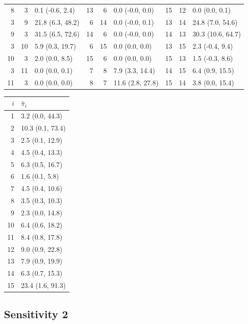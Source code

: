 \begin{table}
\begin{tabular}{|rrl||rrl||rrl|}
 8 & 3 & 0.1 (-0.6, 2.4) & 13 & 6 & 0.0 (-0.0, 0.0) & 15 & 12 & 0.0 (0.0, 0.1) \\
 3 & 9 & 21.8 (6.3, 48.2) & 6 & 14 & 0.0 (-0.0, 0.1) & 13 & 14 & 24.8 (7.0, 54.6) \\
 9 & 3 & 31.5 (6.5, 72.6) & 14 & 6 & 0.0 (-0.0, 0.0) & 14 & 13 & 30.3 (10.6, 64.7) \\
 3 & 10 & 5.9 (0.3, 19.7) & 6 & 15 & 0.0 (0.0, 0.0) & 13 & 15 & 2.3 (-0.4, 9.4) \\
 10 & 3 & 2.0 (0.0, 8.5) & 15 & 6 & 0.0 (0.0, 0.0) & 15 & 13 & 1.5 (-0.3, 8.6) \\
 3 & 11 & 0.0 (0.0, 0.1) & 7 & 8 & 7.9 (3.3, 14.4) & 14 & 15 & 6.4 (0.9, 15.5) \\
 11 & 3 & 0.0 (0.0, 0.0) & 8 & 7 & 11.6 (2.8, 27.8) & 15 & 14 & 3.8 (0.0, 15.4) \\
 \hline
 \end{tabular}
\end{table}

\begin{table}
 \centering
 \label{tab:my_label}
 \begin{tabular}{|rl|}
 \hline
 $i$ & $\tilde{\pi_{i}}$ \\
 \hline\hline
 1 & 3.2 (0.0, 44.3) \\
 2 & 10.3 (0.1, 73.4) \\
 3 & 2.5 (0.1, 12.9) \\
 4 & 4.5 (0.4, 13.3) \\
 5 & 6.3 (0.5, 16.7) \\
 6 & 1.6 (0.1, 5.8) \\
 7 & 4.5 (0.4, 10.6) \\
 8 & 3.5 (0.3, 10.3) \\
 9 & 2.3 (0.0, 14.8) \\
 10 & 6.4 (0.6, 18.2) \\
 11 & 8.4 (0.8, 17.8) \\
 12 & 9.0 (0.9, 22.8) \\
 13 & 7.9 (0.9, 19.9) \\
 14 & 6.3 (0.7, 15.3) \\
 15 & 23.4 (1.6, 91.3) \\
 \hline
 \end{tabular}
\end{table}

\subsection{Sensitivity 2}

